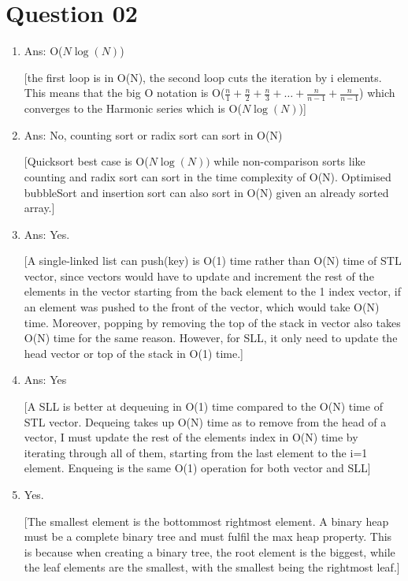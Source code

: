 \documentclass{article}
\begin{document}
\section{Question 02}
\begin{enumerate}[label=(\arabic*)]

\item Ans: O($N\log(N)$)

[the first loop is in O(N), the second loop cuts the iteration by i elements. This means that the big O notation is O($\frac{n}{1} + \frac{n}{2} + \frac{n}{3} + \dots + \frac{n}{n-1} + \frac{n}{n-1}$) which converges to the Harmonic series which is O($N\log(N)$)]

\item Ans: No, counting sort or radix sort can sort in O(N)

[Quicksort best case is O($N\log(N))$ while non-comparison sorts like counting and radix sort can sort in the time complexity of O(N). Optimised bubbleSort and insertion sort can also sort in O(N) given an already sorted array.]

\item Ans: Yes. 

[A single-linked list can push(key) is O(1) time rather than O(N) time of STL vector, since vectors would have to update and increment the rest of the elements in the vector starting from the back element to the 1 index vector, if an element was pushed to the front of the vector, which would take O(N) time. Moreover, popping by removing the top of the stack in vector also takes O(N) time for the same reason. However, for SLL, it only need to update the head vector or top of the stack in O(1) time.]

\item Ans: Yes

[A SLL is better at dequeuing in O(1) time compared to the O(N) time of STL vector. Dequeing takes up O(N) time as to remove from the head of a vector, I must update the rest of the elements index in O(N) time by iterating through all of them, starting from the last element to the i=1 element. Enqueing is the same O(1) operation for both vector and SLL]

\item Yes.

[The smallest element is the bottommost rightmost element. A binary heap must be a complete binary tree and must fulfil the max heap property. This is because when creating a binary tree, the root element is the biggest, while the leaf elements are the smallest, with the smallest being the rightmost leaf.]

\end{enumerate}
\end{document}
